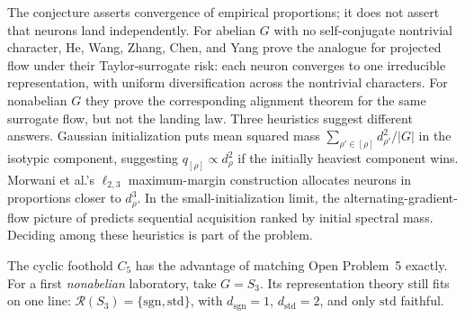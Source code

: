 \documentclass[11pt]{amsart}
\theoremstyle{plain}
\theoremstyle{definition}
\newcommand{\Rcl}{\mathcal{R}}
\begin{document}
The conjecture asserts convergence of empirical proportions; it does not assert that neurons land independently. For abelian $G$ with no self-conjugate nontrivial character, He, Wang, Zhang, Chen, and Yang \cite{he2026spectral} prove the analogue for projected flow under their Taylor-surrogate risk: each neuron converges to one irreducible representation, with uniform diversification across the nontrivial characters. For nonabelian $G$ they prove the corresponding alignment theorem for the same surrogate flow, but not the landing law. Three heuristics suggest different answers. Gaussian initialization puts mean squared mass $\sum_{\rho' \in [\rho]} d_{\rho'}^2/|G|$ in the isotypic component, suggesting $q_{[\rho]}\propto d_\rho^2$ if the initially heaviest component wins. Morwani et al.'s $\ell_{2,3}$ maximum-margin construction allocates neurons in proportions closer to $d_\rho^3$. In the small-initialization limit, the alternating-gradient-flow picture of \cite{kunin2025} predicts sequential acquisition ranked by initial spectral mass. Deciding among these heuristics is part of the problem.

The cyclic foothold $C_5$ has the advantage of matching Open Problem~5 exactly. For a first \emph{nonabelian} laboratory, take $G=S_3$. Its representation theory still fits on one line: $\Rcl(S_3) = \{\mathrm{sgn}, \mathrm{std}\}$, with $d_{\mathrm{sgn}} = 1$, $d_{\mathrm{std}} = 2$, and only $\mathrm{std}$ faithful.
\end{document}
